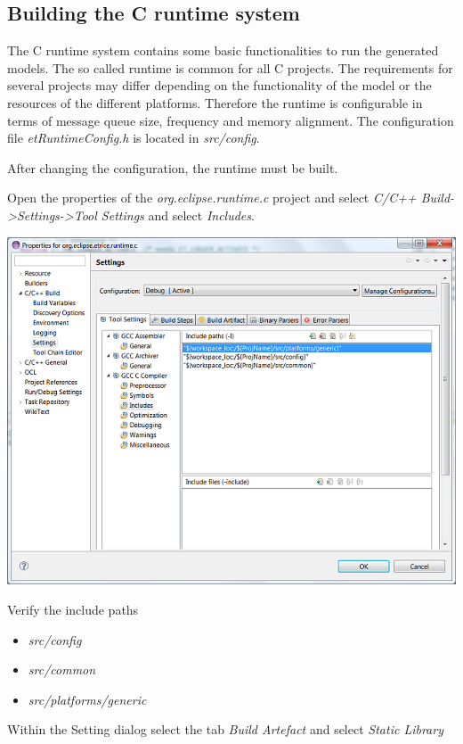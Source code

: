 \subsection{Building the C runtime system}

The C runtime system contains some basic functionalities to run the generated models. The so called 
runtime is common for all C projects. The requirements for several projects may differ depending on the 
functionality of the model or the resources of the different platforms. Therefore the runtime is 
configurable in terms of message queue size, frequency and memory alignment. The configuration file 
\textit{etRuntimeConfig.h} is located in \textit{src/config}.

After changing the configuration, the runtime must be built.

Open the properties of the \textit{org.eclipse.runtime.c} project and select \textit{C/C++ 
Build->Settings->Tool Settings} and select \textit{Includes}.

\includegraphics{images/014-SetupWorkspaceC08.png}

Verify the include paths

\begin{itemize}
\item \textit{src/config}
\item \textit{src/common}
\item \textit{src/platforms/generic}
\end{itemize}

Within the Setting dialog select the tab \textit{Build Artefact} and select \textit{Static Library}

